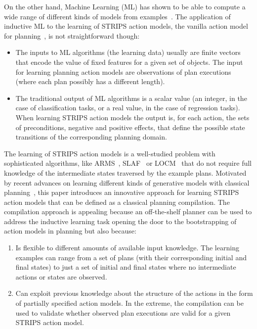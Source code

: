 \documentclass[letterpaper]{article} %
\begin{document}
On the other hand, Machine Learning (ML) has shown to be able to compute a wide range of different kinds of models from examples~\cite{michalski2013machine}. The application of inductive ML to the learning of STRIPS action models, the vanilla action model for planning~\cite{fikes1971strips}, is not straightforward though:
\begin{itemize}
\item The inputs to ML algorithms (the learning data) usually are finite vectors that encode the value of fixed features for a given set of objects. The input for learning planning action models are observations of plan executions (where each plan possibly has a different length).
\item The traditional output of ML algorithms is a scalar value (an integer, in the case of classification tasks, or a real value, in the case of regression tasks). When learning STRIPS action models the output is, for each action, the sets of preconditions, negative and positive effects, that define the possible state transitions of the corresponding planning domain. 
\end{itemize}

The learning of STRIPS action models is a well-studied problem with sophisticated algorithms, like {\sc ARMS}~\cite{yang2007learning}, {\sc SLAF}~\cite{amir:alearning:JAIR08} or {\sc LOCM}~\cite{cresswell2013acquiring} that do not require full knowledge of the intermediate states traversed by the example plans. Motivated by recent advances on learning different kinds of generative models with classical planning~\cite{bonet2009automatic,segovia2016hierarchical,segovia2017generating}, this paper introduces an innovative approach for learning STRIPS action models that can be defined as a classical planning compilation. The compilation approach is appealing because an off-the-shelf planner can be used to address the inductive learning task opening the door to the bootstrapping of action models in planning but also because:
\begin{enumerate}
\item Is flexible to different amounts of available input knowledge. The learning examples can range from a set of plans (with their corresponding initial and final states) to just a set of initial and final states where no intermediate actions or states are observed.
\item Can exploit previous knowledge about the structure of the actions in the form of partially specified action models. In the extreme, the compilation can be used to validate whether observed plan executions are valid for a given STRIPS action model.
\end{enumerate}
\end{document}
